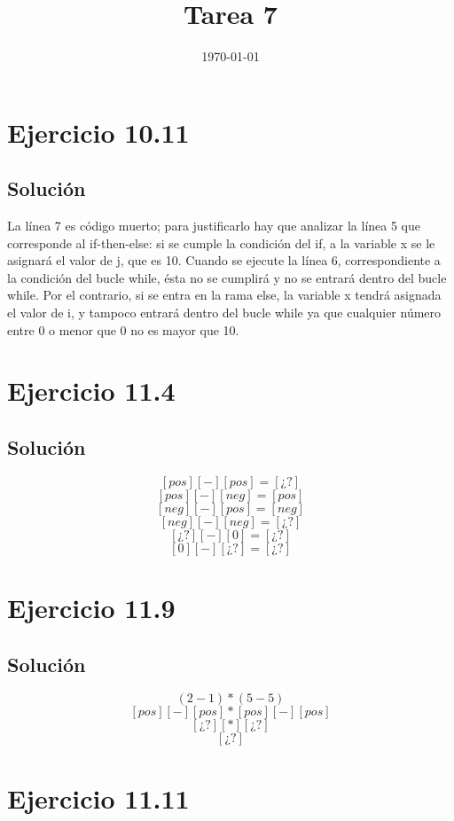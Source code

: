 \documentclass[11pt, a4paper, titlepage]{article}
\begin{document}
\title{Tarea 7}
\date{\today}
\maketitle
\newpage

\section*{Ejercicio 10.11}
\subsection*{Solución}

La línea 7 es código muerto; para justificarlo hay que analizar la línea 5 que
corresponde al if-then-else: si se cumple la condición del if, a la variable x
se le asignará el valor de j, que es 10. Cuando se ejecute la línea 6, correspondiente
a la condición del bucle while, ésta no se cumplirá y no se entrará dentro del bucle
while. Por el contrario, si se entra en la rama else, la variable x tendrá asignada
el valor de i, y tampoco entrará dentro del bucle while ya que cualquier número
entre 0 o menor que 0 no es mayor que 10.

\section*{Ejercicio 11.4}
\subsection*{Solución}
$$[pos] [-] [pos] = [¿?]$$
$$[pos] [-] [neg] = [pos]$$
$$[neg] [-] [pos] = [neg]$$
$$[neg] [-] [neg] = [¿?]$$
$$[¿?] [-] [0] = [¿?]$$
$$[0] [-] [¿?] = [¿?]$$

\section*{Ejercicio 11.9}
\subsection*{Solución}

$$(2-1) * (5-5)$$
$$[pos] [-] [pos] * [pos] [-] [pos]$$
$$[¿?] [*] [¿?]$$
$$[¿?]$$

\section*{Ejercicio 11.11}
\end{document}
